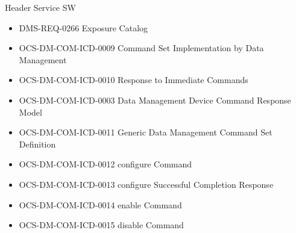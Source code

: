 Header Service SW \begin{itemize}
\item DMS-REQ-0266 Exposure Catalog
\item OCS-DM-COM-ICD-0009 Command Set Implementation by Data Management
\item OCS-DM-COM-ICD-0010 Response to Immediate Commands
\item OCS-DM-COM-ICD-0003 Data Management Device Command Response Model
\item OCS-DM-COM-ICD-0011 Generic Data Management Command Set Definition
\item OCS-DM-COM-ICD-0012 configure Command
\item OCS-DM-COM-ICD-0013 configure Successful Completion Response
\item OCS-DM-COM-ICD-0014 enable Command
\item OCS-DM-COM-ICD-0015 disable Command
\end{itemize}
